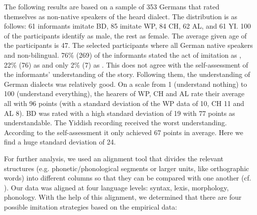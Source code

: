 \documentclass[output=paper]{LSP/langsci}
\begin{document}
The following results are based on a sample of 353 Germans that rated themselves as non-native speakers of the heard dialect. The distribution is as follows: 61 informants imitate BD, 85 imitate WP, 84 CH, 62 AL, and 61 YI. 100 of the participants identify as male, the rest as female. The average given age of the participants is 47. The selected participants where all German native speakers and non-bilingual. 76\% (269) of the informants stated the act of imitation as , 22\% (76) as  and only 2\% (7) as . This does not agree with the self-assessment of the informants' understanding of the story. Following them, the understanding of German dialects was rela\-tively good. On a scale from 1 (understand nothing) to 100 (understand everything), the hearers of WP, CH and AL rate their average all with 96 points (with a standard deviation of the WP data of 10, CH 11 and AL 8). BD was rated with a high standard deviation of 19 with 77 points as understandable. The Yiddish recording received the worst understanding. According to the self-assessment it only achieved 67 points in average. Here we find a huge standard deviation of 24.

For further analysis, we used an alignment tool that divides the relevant structures (e.g. phonetic/phonological segments or larger units, like orthographic words) into different columns so that they can be compared with one another (cf. \citealt{mayer_language_2012}). Our data was aligned at four language levels: syntax, lexis, morphology, phonology. With the help of this alignment, we determined that there are four possible imitation strategies based on the empirical data:
 
\end{document}
